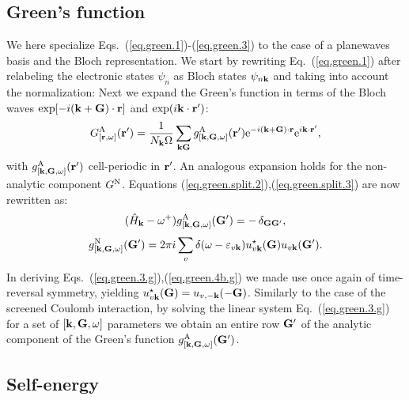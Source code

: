 \documentclass[twocolumn,prb,showpacs,superscriptaddress]{revtex4}
\def\w{\omega}
\def\H{\hat{H}}
\def\E{\varepsilon}
\def\k{{\bf k}}
\def\G{{\bf G}}
\def\Gp{{\bf G^\prime}}
\def\r{{\bf r}}
\def\rp{{\bf r^\prime}}
\begin{document}
\subsection{Green's function}\label{sec.green.g}

We here specialize Eqs.\ (\ref{eq.green.1})-(\ref{eq.green.3}) to the case
of a planewaves basis and the Bloch representation.
We start by rewriting Eq.\ (\ref{eq.green.1}) after relabeling the electronic states
$\psi_n$ as Bloch states $\psi_{n\k}$ and taking into account the
normalization:
Next we expand the Green's function in terms
of the Bloch waves ${\rm exp}[-i(\k+\G)\cdot\r]$ and ${\rm exp}(i\k\cdot\rp)$:
  \begin{equation}\label{eq.green.bloch}
  G^{\rm A}_{[\r,\w]} (\rp) = \frac{1}{N_\k\Omega}  \sum_{\k\G} g^{\rm A}_{[\k,\G,\w]}(\rp)
   {\rm e}^{-i(\k+\G)\cdot\r} {\rm e}^{i\k\cdot\rp},
  \end{equation}
with $g^{\rm A}_{[\k,\G,\w]}(\rp)$ cell-periodic in $\rp$. An analogous expansion
holds for the non-analytic component $G^{\rm N}$.
Equations (\ref{eq.green.split.2}),(\ref{eq.green.split.3}) are now rewritten as:
  \begin{equation}\label{eq.green.3.g}
   (\H_\k-\w^+)  g^{\rm A}_{[\k,\G,\w]}(\Gp)  =  -\,\delta_{\G\Gp},
  \end{equation}
  \begin{equation} \label{eq.green.4b.g}
  g^{\rm N}_{[\k,\G,\w]}(\Gp)  =  
  2\pi i \sum_v \delta(\w-\E_{v\k}) u^\star_{v\k}(\G)u_{v\k} (\Gp).
  \end{equation}
In deriving Eqs.\ (\ref{eq.green.3.g}),(\ref{eq.green.4b.g}) we made use once again
of time-reversal symmetry, yielding
$u^\star_{v\k}(\G) = u_{v,-\k}(-\G)$.
Similarly to the case of the screened Coulomb interaction, by solving the
linear system Eq.\ (\ref{eq.green.3.g}) for a set of $[\k,\G,\w]$ parameters
we obtain an entire row $\Gp$ of the analytic component of the
Green's function $g^{\rm A}_{[\k,\G,\w]}(\Gp)$.

\subsection{Self-energy}\label{sec.sigma.g}
\end{document}

